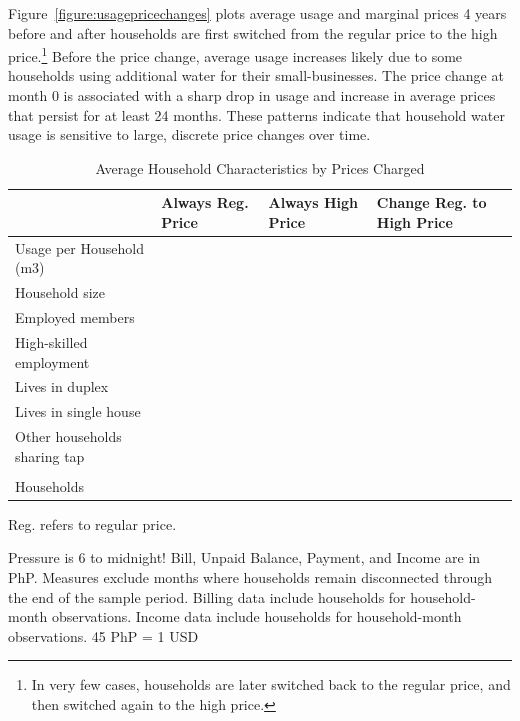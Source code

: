 \documentclass[12pt,table]{article}
\begin{document}
Figure~\ref{figure:usagepricechanges} plots average usage and marginal prices 4 years before and after households are first switched from the regular price to the high price.\footnote{In very few cases, households are later switched back to the regular price, and then switched again to the high price.}  Before the price change, average usage increases likely due to some households using additional water for their small-businesses.  The price change at month 0 is associated with a sharp drop in usage and increase in average prices that persist for at least 24 months.  These patterns indicate that household water usage is sensitive to large, discrete price changes over time.  


\begin{table}[h!] %
\centering
\caption{Average Household Characteristics by Prices Charged}\label{table:pricechangestatistics}
\vspace{-2mm}
\begin{threeparttable}
\begin{tabular}{@{}l*{1}{KKK}@{}}
\toprule
  & Always Reg. Price & Always High Price  & Change Reg. to High Price \\
\midrule
Usage per Household (m3)&  \\
Household size &  \\
Employed members &  \\
High-skilled employment &  \\
Lives in duplex&  \\
Lives in single house&  \\
Other households sharing tap&  \\
\\[-.5em]
Households &  \\
\bottomrule
\end{tabular}
\begin{tablenotes}
\footnotesize
\item  Reg. refers to regular price.  

Pressure is 6 to midnight! Bill, Unpaid Balance, Payment, and Income are in PhP.  Measures exclude months where households remain disconnected through the end of the sample period.  Billing data include households for household-month observations.  Income data include households for household-month observations.  45 PhP = 1 USD \,\,
\end{tablenotes}
\end{threeparttable}
\end{table}
\end{document}
